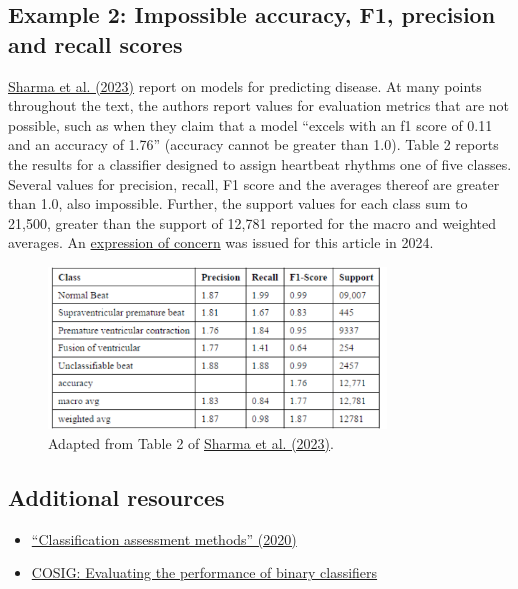 \documentclass[letterpaper, 12pt]{article}
\begin{document}
\pagebreak

\subsection*{Example 2: Impossible accuracy, F1, precision and recall scores}

\href{https://doi.org/10.1109/IC3I59117.2023.10397896}{Sharma et al. (2023)} report on models for predicting disease. At many points throughout the text, the authors report values for evaluation metrics that are not possible, such as when they claim that a model ``excels with an f1
score of 0.11 and an accuracy of 1.76'' (accuracy cannot be greater than 1.0). Table 2 reports the results for a classifier designed to assign heartbeat rhythms one of five classes. Several values for precision, recall, F1 score and the averages thereof are greater than 1.0, also impossible. Further, the support values for each class sum to 21,500, greater than the support of 12,781 reported for the macro and weighted averages. An \href{https://doi.org/10.1109/IC3I59117.2023.10703725}{expression of concern} was issued for this article in 2024.

\begin{figure}[h!tbp]
    \centering
    \includegraphics[width=0.8\textwidth]{img/multiclass_classifiers/sharma_et_al_table_2.png}
    \caption*{Adapted from Table 2 of \href{https://doi.org/10.1109/IC3I59117.2023.10397896}{Sharma et al. (2023)}.}
\end{figure}

\subsection*{Additional resources}

\begin{itemize}
    \setlength\itemsep{-0.5em}
    \item \href{https://doi.org/10.1016/j.aci.2018.08.003}{``Classification assessment methods'' (2020)}
    \item  \href{https://osf.io/pvr4a}{COSIG: Evaluating the performance of binary classifiers}
\end{itemize}
\end{document}
